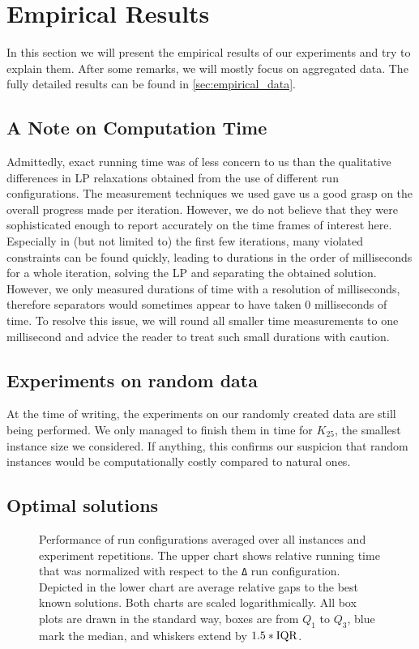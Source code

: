 \section{Empirical Results}\label{sec:empirical_results}
In this section we will present the empirical results of our experiments and try to explain them.
After some remarks, we will mostly focus on aggregated data.
The fully detailed results can be found in \cref{sec:empirical_data}.

\subsection{A Note on Computation Time}
Admittedly, exact running time was of less concern to us than the qualitative differences in LP relaxations obtained from the use of different run configurations.
The measurement techniques we used gave us a good grasp on the overall progress made per iteration.
However, we do not believe that they were sophisticated enough to report accurately on the time frames of interest here.
Especially in (but not limited to) the first few iterations, many violated constraints can be found quickly,
leading to durations in the order of milliseconds for a whole iteration, \ie solving the LP and separating the obtained solution.
However, we only measured durations of time with a resolution of milliseconds, therefore separators would sometimes appear to have taken 0 milliseconds of time.
To resolve this issue, we will round all smaller time measurements to one millisecond and advice the reader to treat such small durations with caution.

\subsection{Experiments on random data}
At the time of writing, the experiments on our randomly created data are still being performed.
We only managed to finish them in time for $K_{25}$, the smallest instance size we considered.
If anything, this confirms our suspicion that random instances would be computationally costly compared to natural ones.

\subsection{Optimal solutions}\label{subsec:optimal_solutions}

\begin{figure}
	\centering
	\resizebox{\linewidth}{!}{
	}
	\bigskip
	\caption[Performance of run configurations]{Performance of run configurations averaged over all instances and experiment repetitions.
		The upper chart shows relative running time that was normalized with respect to the \texttt{Δ} run configuration.
		Depicted in the lower chart are average relative gaps to the best known solutions.
		Both charts are scaled logarithmically.
		All box plots are drawn in the standard way, \ie boxes are from $Q_{1}$ to $Q_{3}$, blue mark the median, and whiskers extend by $1.5*\mathit{\text{IQR}}$.}
	\label{fig:time_bars}
\end{figure}

